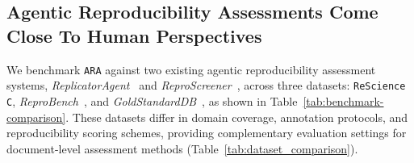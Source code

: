 \documentclass{article}
\begin{document}
\subsection{Agentic Reproducibility Assessments Come Close To Human Perspectives} \label{sec:benchmark}

        


We benchmark \texttt{ARA} against two existing agentic reproducibility assessment systems, \textit{ReplicatorAgent}~\citep{nguyen2026replicatorbench} and \textit{ReproScreener}~\citep{bhaskar2024reproscreener}, across three datasets: \texttt{ReScience C}, \textit{ReproBench}~\citep{hu2025repro}, and \textit{GoldStandardDB}~\citep{bhaskar2024reproscreener}, as shown in Table~\ref{tab:benchmark-comparison}.
These datasets differ in domain coverage, annotation protocols, and reproducibility scoring schemes, providing complementary evaluation settings for document-level assessment methods (Table~\ref{tab:dataset_comparison}).
\end{document}
